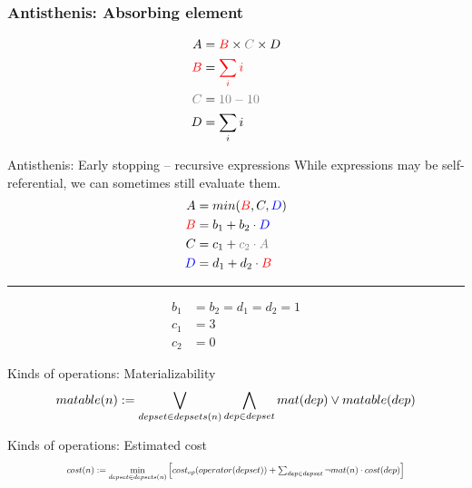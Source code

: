 \begin{frame}
  \frametitle{Antisthenis: Absorbing element}
  \begin{align*}
    A &= {\color{red}B} \times {\color{gray}C} \times D \\
    {\color{red}B} &= {\color{red}\sum_i{i}} \\
    {\color{gray}C} &= {\color{gray}10 - 10} \\
    D &= \sum_i{i}
  \end{align*}
\end{frame}


\begin{frame}{Antisthenis: Early stopping -- recursive expressions}
  {While expressions may be self-referential, we can
    sometimes still evaluate them.}
  \begin{align*}
    A &= min({\color{red}B}, C, {\color{blue}D}) \\
    {\color{red}B} &= b_1 + b_2 \cdot {\color{blue}D} \\
    C &= c_1 + {\color{gray}c_2 \cdot A} \\
    {\color{blue}D} &= d_1 + d_2 \cdot {\color{red}B} \\
  \end{align*}
  \hrule
  \begin{align*}
    b_1 &= b_2 = d_1 = d_2 = 1 \\
    c_1 &= 3 \\
    c_2 &= 0
  \end{align*}
\end{frame}

\newcommand{\wlor}{\mathop{\bigvee}\displaylimits}
\newcommand{\wland}{\mathop{\bigwedge}\displaylimits}
\begin{frame}{Kinds of operations: Materializability}
  \[
    matable(n) := \wlor_{depset \in depsets(n)}\wland_{dep \in depset} mat(dep) \lor matable(dep)
  \]
\end{frame}

\begin{frame}{Kinds of operations: Estimated cost}
    \[
  \scalebox{0.7}{
    \(cost(n) := \min\limits_{depset \in depsets(n)}\left[cost_{op}(operator(depset)) + \sum_{dep \in depset}\neg mat(n) \cdot cost(dep)\right]\)
    }
    \]
\end{frame}
